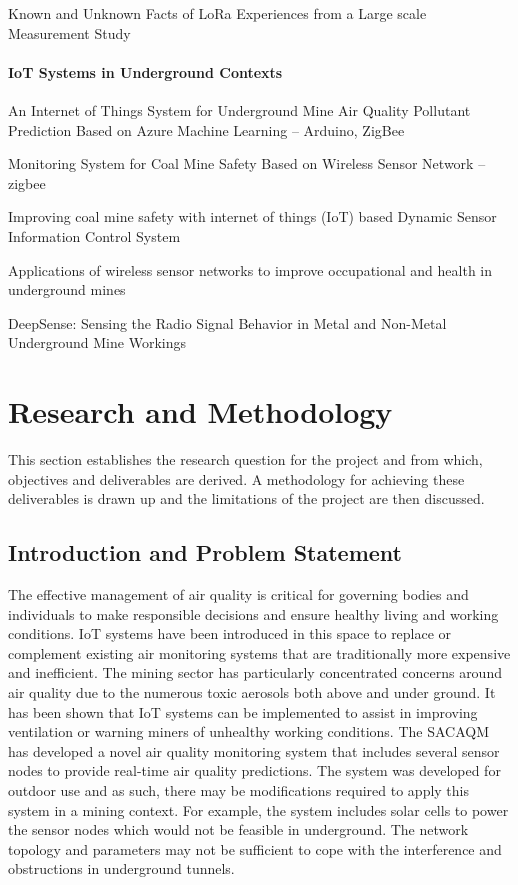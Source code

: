 \documentclass[a4paper,twoside,12pt]{report}
\begin{document}
Known and Unknown Facts of LoRa Experiences from a Large scale Measurement Study \cite{Liando2019KnownStudy}

\subsubsection{IoT Systems in Underground Contexts}

An Internet of Things System for Underground Mine Air Quality Pollutant Prediction Based on Azure Machine Learning \cite{Jo_Khan_2018} -- Arduino, ZigBee

Monitoring System for Coal Mine Safety Based on Wireless Sensor Network \cite{Zhu2019MonitoringNetwork} -- zigbee

Improving coal mine safety with internet of things (IoT) based Dynamic Sensor Information Control System \cite{Ali2022ImprovingSystem} 

Applications of wireless sensor networks to improve occupational and health in underground mines \cite{Sadeghi2022ApplicationsMines}

DeepSense: Sensing the Radio Signal Behavior in Metal and Non-Metal Underground Mine Workings \cite{Ranjan2018DeepSense:Workings}

\chapter{Research and Methodology}
This section establishes the research question for the project and from which, objectives and deliverables are derived. A methodology for achieving these deliverables is drawn up and the limitations of the project are then discussed.

\section{Introduction and Problem Statement}
The effective management of air quality is critical for governing bodies and individuals to make responsible decisions and ensure healthy living and working conditions. IoT systems have been introduced in this space to replace or complement existing air monitoring systems that are traditionally more expensive and inefficient. 
\newline \newline
The mining sector has particularly concentrated concerns around air quality due to the numerous toxic aerosols both above and under ground. It has been shown that IoT systems can be implemented to assist in improving ventilation or warning miners of unhealthy working conditions. 
\newline \newline
The SACAQM has developed a novel air quality monitoring system that includes several sensor nodes to provide real-time air quality predictions. The system was developed for outdoor use and as such, there may be modifications required to apply this system in a mining context. For example, the system includes solar cells to power the sensor nodes which would not be feasible in underground. The network topology and parameters may not be sufficient to cope with the interference and obstructions in underground tunnels.
\end{document}
